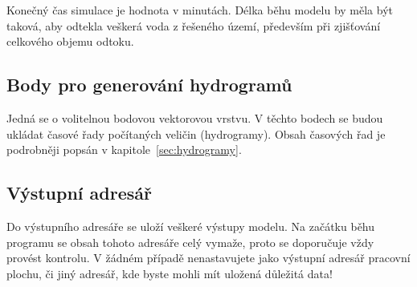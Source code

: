 
Konečný čas simulace je hodnota v minutách. Délka běhu modelu by měla být taková, aby odtekla veškerá voda z řešeného území, především při zjišťování celkového objemu odtoku.
 
















\subsection{Body pro generování hydrogramů} \label{sec:vstupbody}

Jedná  se o volitelnou bodovou vektorovou vrstvu. V těchto bodech se budou ukládat časové řady počítaných veličin (hydrogramy). Obsah časových řad je podrobněji popsán v kapitole~\ref{sec:hydrogramy}.











\subsection{Výstupní adresář} \label{sec:vstupadresar}
Do výstupního adresáře se uloží veškeré výstupy modelu. Na začátku běhu programu se obsah tohoto adresáře celý vymaže, proto se doporučuje vždy provést kontrolu. V žádném případě nenastavujete jako výstupní adresář pracovní plochu, či jiný adresář, kde byste mohli mít uložená důležitá data!

